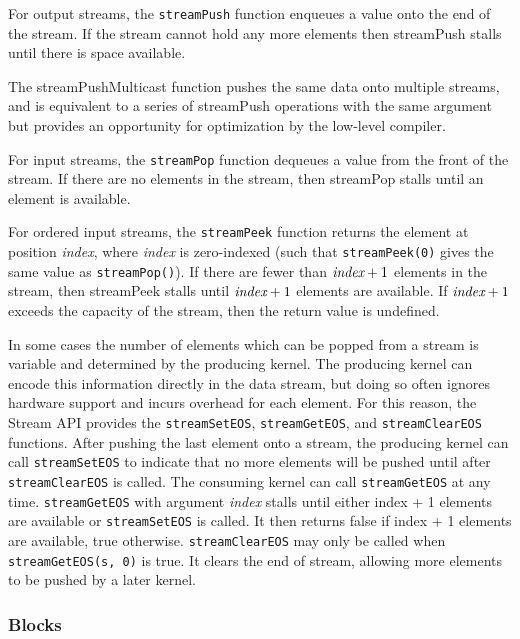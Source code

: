  For output streams, the {\tt streamPush} function enqueues a value onto the end of the stream.  If the stream cannot hold any more elements 
then streamPush stalls until there is space available. 

 The streamPushMulticast function pushes 
the same data onto multiple streams, and is equivalent to a series of streamPush 
operations with the same argument but provides an opportunity for optimization by the low-level compiler.

 For input streams, the {\tt streamPop} function dequeues a value from the front of the stream.  If there are no elements in the stream, then streamPop stalls until an element is available.

 For ordered input streams, the {\tt streamPeek} function returns the element at position {\it index}, where {\it index} is zero-indexed (such that {\tt streamPeek(0)} gives the same value as {\tt streamPop()}).  If there are fewer than $\mbox{\it index}+1$ elements in the stream, then streamPeek stalls until $\mbox{\it index}+1$ elements are available. If $\mbox{\it index}+1$ exceeds the capacity of the stream, then the 
return value is undefined.

 In some cases the number of elements which can 
be popped from a stream is variable and determined by the producing kernel. 
The producing kernel can encode this information directly in the data stream, 
but doing so often ignores hardware support and incurs overhead for each element. For this reason, the Stream API provides the {\tt streamSetEOS}, {\tt streamGetEOS}, and {\tt streamClearEOS}
functions. After pushing the last element onto a stream, the producing kernel can call 
{\tt streamSetEOS} to indicate that no more elements will be pushed until after {\tt streamClearEOS} is called. The 
consuming kernel can call {\tt streamGetEOS} at any time. {\tt streamGetEOS} with argument  
{\it index} stalls until either index + 1 elements are available or {\tt streamSetEOS} is called. It then returns false if index + 1 elements are available, true otherwise. {\tt streamClearEOS} may only be called when {\tt streamGetEOS(s, 0)} is true. It clears the end of stream, allowing more elements to be pushed by a later kernel.

\subsubsection{Blocks}
\label{sec:blocks}

